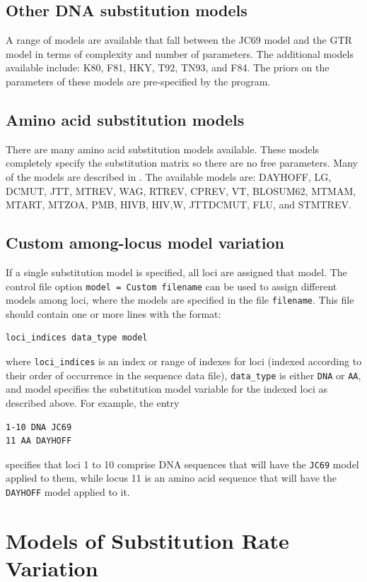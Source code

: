\documentclass[a4paper]{book}
\numberwithin{equation}{section} \renewcommand{\baselinestretch}{0.55}
\begin{document}
\subsection{Other DNA substitution models}
A range of models are available that fall between the JC69 model and
the GTR model in terms of complexity and number of parameters.
The additional models available include: K80, F81, HKY, T92, TN93, and F84. The
priors on the parameters of these models are pre-specified by the program.
\subsection{Amino acid substitution models}
There are many amino acid substitution models available. These models
completely specify the substitution matrix so there are no free parameters.
Many of the models are described in \citet{Yang2014b}. The available models
are: DAYHOFF, LG, DCMUT, JTT, MTREV, WAG, RTREV, CPREV, VT, BLOSUM62, MTMAM, MTART, MTZOA, PMB, HIVB, HIV,W, JTTDCMUT, FLU, and STMTREV.
\subsection{Custom among-locus model variation}
If a single substitution model is specified, all loci are assigned that model.
The control file option \texttt{model = Custom filename} can be used to assign
different models among loci, where the models are specified in the file \texttt{filename}.
This file should contain one or more lines with the format:
\begin{verbatim}
loci_indices data_type model
\end{verbatim}
where \texttt{loci\_indices} is an index or range of indexes for loci (indexed according to their order of occurrence in the sequence data file),
\texttt{data\_type} is either \texttt{DNA} or \texttt{AA}, and model specifies the substitution model variable for the indexed loci as described above.
For example, the entry
\begin{verbatim}
1-10 DNA JC69
11 AA DAYHOFF
\end{verbatim}
specifies that loci 1 to 10 comprise DNA sequences that will have the \texttt{JC69} model applied to them, while locus 11 is an amino acid sequence
that will have the \texttt{DAYHOFF} model applied to it.
\section{Models of Substitution Rate Variation}
\end{document}
